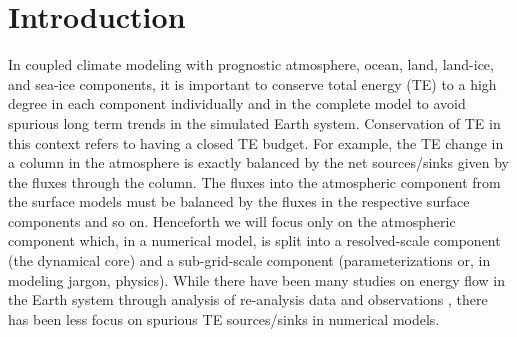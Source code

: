 \documentclass{agujournal}
\begin{document}
% 


%
% 
% 
% 


\section{Introduction}
In coupled climate modeling with prognostic atmosphere, ocean, land, land-ice, and sea-ice components, it is important to conserve total energy (TE) to a high degree in each component individually and in the complete model to avoid spurious long term trends in the simulated Earth system. Conservation of TE in this context refers to having a closed TE budget. For example, the TE change in a column in the atmosphere is exactly balanced by the net sources/sinks given by the fluxes through the column. The fluxes into the atmospheric component from the surface models must be balanced by the fluxes in the respective surface components and so on. Henceforth we will focus only on the atmospheric component which, in a numerical model, is split into a resolved-scale component (the dynamical core) and a sub-grid-scale component (parameterizations or, in modeling jargon, physics). While there have been many studies on energy flow in the Earth system through analysis of re-analysis data and observations \citep[][and references herein]{TF2018JC}, there has been less focus on spurious TE sources/sinks in numerical models.
\end{document}

